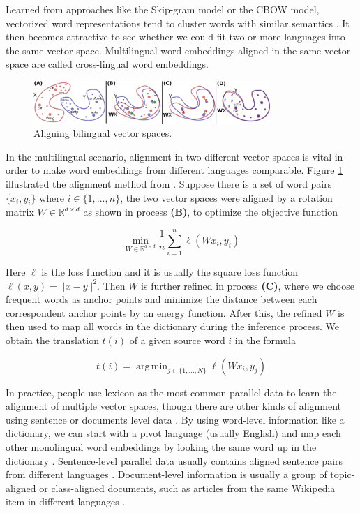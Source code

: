 \documentclass[thesis]{cluu}
\DeclareMathOperator*{\argmin}{arg\,min}
\begin{document}
Learned from approaches like the Skip-gram model or the CBOW model, vectorized word representations tend to cluster words with similar semantics \parencite{Mikolov:2013ac}. It then becomes attractive to see whether we could fit two or more languages into the same vector space. Multilingual word embeddings aligned in the same vector space are called cross-lingual word embeddings.

\begin{figure}
  \centering
  \includegraphics[width=0.8\textwidth]{vector_spaces_alignment.png}
  \caption{Aligning bilingual vector spaces. \parencite{Conneau:2017aa}}
  \label{fig:vec_space_align}
\end{figure}

In the multilingual scenario, alignment in two different vector spaces is vital in order to make word embeddings from different languages comparable. Figure \ref{fig:vec_space_align} illustrated the alignment method from \textcite{Conneau:2017aa}. Suppose there is a set of word pairs $\{x_i, y_i\}$ where ${i\in \{1, ..., n\}}$, the two vector spaces were aligned by a rotation matrix $W \in \mathbb{R}^{d \times d}$ as shown in process \textbf{(B)}, to optimize the objective function 

\begin{equation*}
  \min_{W \in \mathbb{R}^{d \times d}} \frac{1}{n}\sum_{i=1}^n \ell(Wx_i, y_i)
\end{equation*}

\noindent Here $\ell$ is the loss function and it is usually the square loss function $\ell(x, y)=||x-y||^2$. Then $W$ is further refined in process \textbf{(C)}, where we choose frequent words as anchor points and minimize the distance between each correspondent anchor points by an energy function. After this, the refined $W$ is then used to map all words in the dictionary during the inference process. We obtain the translation $t(i)$ of a given source word $i$ in the formula

\begin{equation*}
  t(i) = \argmin_{j\in \{1, ..., N\}} \ell(Wx_i, y_j)
\end{equation*}

In practice, people use lexicon as the most common parallel data to learn the alignment of multiple vector spaces, though there are other kinds of alignment using sentence or documents level data \parencite{Ruder:2019aa}. By using word-level information like a dictionary, we can start with a pivot language (usually English) and map each other monolingual word embeddings by looking the same word up in the dictionary \parencite{Mikolov:2013ac}. Sentence-level parallel data usually contains aligned sentence pairs from different languages \parencite{Hermann:2013aa}. Document-level information is usually a group of topic-aligned or class-aligned documents, such as articles from the same Wikipedia item in different languages \parencite{vulic-moens-2013-study}.
\end{document}
